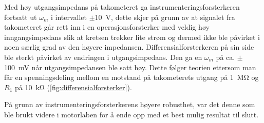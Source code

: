 Med høy utgangsimpedans på takometeret ga instrumenteringsforsterkeren fortsatt ut $\omega_m$ i intervallet $\pm${\SI{10}{\volt}}, dette skjer på grunn av at signalet fra takometeret går rett inn i en operasjonsforsterker med veldig høy inngangsimpedans slik at kretsen trekker lite strøm og dermed ikke ble påvirket i noen særlig grad av den høyere impedansen. 
Differensialforsterkeren på sin side ble sterkt påvirket av endringen i utgangsimpedans. Den ga en $\omega_m$ på ca. $\pm${\SI{100}{\milli\volt}} når utgangsimpedansen ble satt høy. Dette følger teorien ettersom man får en spenningsdeling mellom en motstand på takometerets utgang på {\SI{1}{\mega\ohm}}\cite{AnalogMotorlabbOppgaver} og $R_1$ på {\SI{10}{\kilo\ohm}} (\autoref{fig:differensialforsterker}).

På grunn av instrumenteringsforsterkerens høyere robusthet, var det denne som ble brukt videre i motorlaben for å ende opp med et best mulig resultat til slutt.
